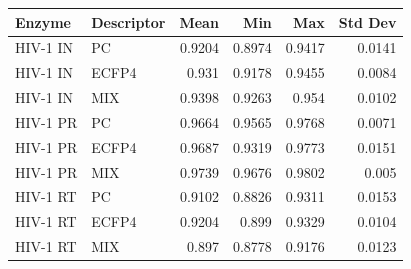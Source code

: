\begin{tabular}{llrrrr}
\toprule
Enzyme & Descriptor & Mean & Min & Max & Std Dev \\
\midrule
HIV-1 IN & PC & 0.9204 & 0.8974 & 0.9417 & 0.0141 \\
HIV-1 IN & ECFP4 & 0.931 & 0.9178 & 0.9455 & 0.0084 \\
HIV-1 IN & MIX & 0.9398 & 0.9263 & 0.954 & 0.0102 \\
HIV-1 PR & PC & 0.9664 & 0.9565 & 0.9768 & 0.0071 \\
HIV-1 PR & ECFP4 & 0.9687 & 0.9319 & 0.9773 & 0.0151 \\
HIV-1 PR & MIX & 0.9739 & 0.9676 & 0.9802 & 0.005 \\
HIV-1 RT & PC & 0.9102 & 0.8826 & 0.9311 & 0.0153 \\
HIV-1 RT & ECFP4 & 0.9204 & 0.899 & 0.9329 & 0.0104 \\
HIV-1 RT & MIX & 0.897 & 0.8778 & 0.9176 & 0.0123 \\
\bottomrule
\end{tabular}
